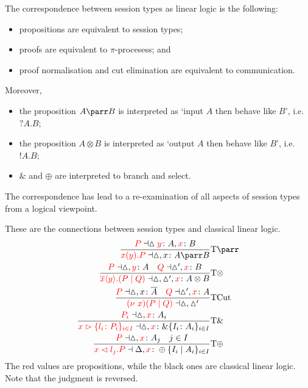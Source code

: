 \documentclass[a4paper, openany]{memoir}
\theoremstyle{definition}
\begin{document}
    The correspondence between session types as linear logic is the following:
    \begin{itemize}
        \item propositions are equivalent to session types;
        \item proofs are equivalent to $\pi$-procesess; and
        \item proof normalisation and cut elimination are equivalent to communication.
    \end{itemize}
    Moreover,
    \begin{itemize}
        \item the proposition $A \parr B$ is interpreted as `input $A$ then behave like $B$', i.e. $?A.B$;
        \item the proposition $A \otimes B$ is interpreted as `output $A$ then behave like $B$', i.e. $!A.B$;
        \item $\&$ and $\oplus$ are interpreted to branch and select.
    \end{itemize}
    The correspondence has lead to a re-examination of all aspects of session types from a logical viewpoint.

    These are the connections between session types and classical linear logic.
    \begin{align*}
        \frac{{\color{red} P} \dashv \vartriangle {\color{red} y} \colon A, {\color{red} x} \colon B}{{\color{red}x(y).P} \dashv \vartriangle, x \colon A \parr B} & \textrm{T}\parr \\
        \frac{{\color{red} P} \dashv \vartriangle, {\color{red} y} \colon A \quad {\color{red} Q} \dashv \vartriangle', {\color{red} x} \colon B}{{\color{red} \overline{x} \langle y \rangle.(P \mid Q)} \dashv \vartriangle, \vartriangle', {\color{red} x} \colon A \otimes B} & \textrm{T}\otimes \\
        \frac{{\color{red} P} \dashv \vartriangle, x \colon \overline{A} \quad {\color{red} Q} \dashv \vartriangle', {\color{red} x} \colon A}{{\color{red} (\nu \ x)(P \mid Q)} \dashv \vartriangle, \vartriangle'} & \textrm{TCut} \\
        \frac{{\color{red} P_i} \dashv \vartriangle, {\color{red} x} \colon A_i}{{\color{red} x \vartriangleright \{l_i \colon P_i\}_{i \in I}} \dashv \vartriangle, {\color{red} x} \colon \&\{I_i \colon A_i\}_{i \in I}} & \textrm{T} \& \\
        \frac{{\color{red} P} \dashv \vartriangle, {\color{red} x} \colon A_j \quad j \in I}{{\color{red} x \vartriangleleft l_j.P} \dashv \Delta, {\color{red} x} \colon \oplus \{I_i \mid A_i\}_{i \in I}} & \textrm{T}\oplus 
    \end{align*}
    The red values are propositions, while the black ones are classical linear logic. Note that the judgment is reversed.
\end{document}
